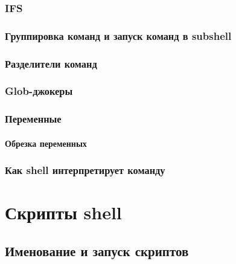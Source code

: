\documentclass[oneside]{book}
\begin{document}
         \subsection{IFS}
         

         \subsection{Группировка команд и запуск команд в subshell}
         

         \subsection{Разделители команд}
         

         \subsection{Glob-джокеры}
         

         \subsection{Переменные}
         

            \subsubsection{Обрезка переменных}
            

         \subsection{Как shell интерпретирует команду}
         

   \chapter{Скрипты shell}
   

      \section{Именование и запуск скриптов}
      
\end{document}
